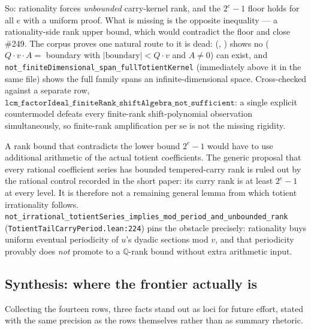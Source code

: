 \begin{rem}
So: rationality forces \emph{unbounded} carry-kernel rank, and the $2^e{-}1$ floor holds for all
$e$ with a uniform proof. What is missing is the opposite inequality --- a rationality-side rank
upper bound, which would contradict the floor and close \#249. The corpus proves one natural route
to it is dead:
 (,
) shows no
 ($Q\cdot v\cdot A = $ boundary
with $|\mathrm{boundary}| < Q\cdot v$ and $A\ne 0$) can exist, and
\texttt{not\_finiteDimensional\_span\_fullTotientKernel} (immediately above it in the same file)
shows the full family spans an infinite-dimensional space. Cross-checked against a separate row,
$\mathtt{lcm\_factorIdeal\_finiteRank\_shiftAlgebra\_not\_sufficient}$: a single explicit
countermodel defeats every finite-rank shift-polynomial observation simultaneously, so finite-rank
amplification per se is not the missing rigidity.
\end{rem}

\begin{prop}
A rank bound that contradicts the lower bound $2^e-1$ would have to use
additional arithmetic of the actual totient coefficients. The generic
proposal that every rational coefficient series has bounded tempered-carry
rank is ruled out by the rational control recorded in the short paper:
its carry rank is at least $2^e-1$ at every level. It is therefore not a
remaining general lemma from which totient irrationality follows.
\texttt{not\_irrational\_totientSeries\_implies\_mod\_period\_and\_unbounded\_rank}
(\texttt{TotientTailCarryPeriod.lean:224}) pins the obstacle precisely: rationality buys uniform
eventual periodicity of $u$'s dyadic sections mod $v$, and that periodicity provably does
\emph{not} promote to a $\mathbb Q$-rank bound without extra arithmetic input.
\end{prop}

\subsection{Synthesis: where the frontier actually is}

Collecting the fourteen rows, three facts stand out as loci for future effort, stated with the same
precision as the rows themselves rather than as summary rhetoric.

